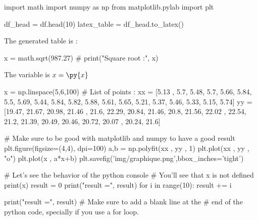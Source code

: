 \documentclass[11pt]{article}%
\begin{document}
\begin{pycode}
import math
import numpy as np
from matplotlib.pylab import plt    
\end{pycode}


\begin{pycode}
df_head = df.head(10)
latex_table = df_head.to_latex()
\end{pycode}
    
The generated table is :
\begin{center}
\end{center}


\begin{pycode}
x = math.sqrt(987.27)
# print("Square root :",  x)
\end{pycode}

\vspace{5em}

The variable is $x=\py{x}$


\begin{pycode}
x = np.linspace(5,6,100)
# List of points :
xx = [5.13 , 5.7, 5.48, 5.7, 5.66, 5.84, 5.5, 5.69, 5.44, 5.84, 5.82, 5.88, 5.61, 5.65, 5.21, 5.37, 5.46, 5.33, 5.15, 5.74]
yy = [19.47, 21.67, 20.98, 21.46 , 21.6, 22.29, 20.84, 21.46, 20.8, 21.56, 22.02 , 22.54, 21.2, 21.39, 20.49, 20.46, 20.72, 20.07 , 20.24, 21.6]

# Make sure to be good with matplotlib and numpy to have a good result
plt.figure(figsize=(4,4), dpi=100)
a,b = np.polyfit(xx , yy , 1)
plt.plot(xx , yy , "o")
plt.plot(x , a*x+b)
plt.savefig('img/graphique.png',bbox_inches='tight')
\end{pycode}




\vspace{5em}

\begin{pyconsole}
# Let's see the behavior of the python console
# You'll see that x is not defined
print(x)
result = 0
print("result =", result)
for i in range(10):
    result += i

print("result =", result)
# Make sure to add a blank line at the 
# end of the python code, specially if you use a for loop.
\end{pyconsole}
\end{document}
